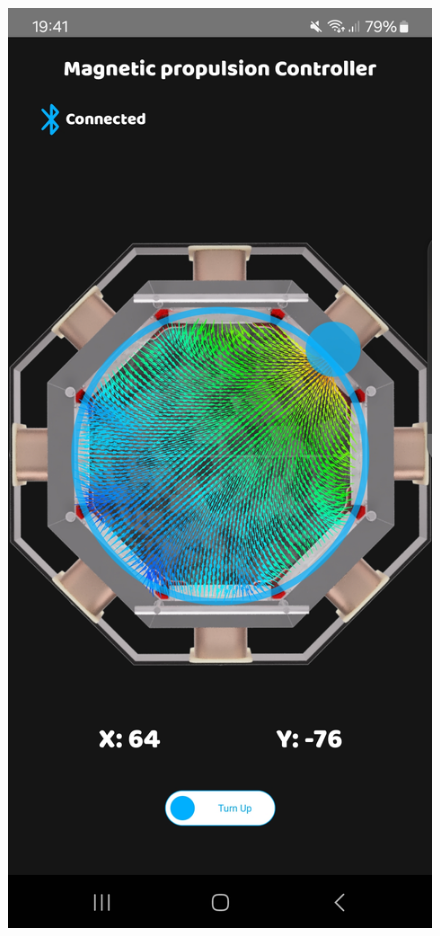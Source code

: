\documentclass{article}
\begin{document}
\begin{figure}[H]
\begin{minipage}{0.3\textwidth}
    \end{minipage}\hfill
   \begin{minipage}{0.3\textwidth}
        \centering
        \includegraphics[width=\linewidth]{Images/app1 (1).jpg}


\end{minipage}
\end{figure}
\end{document}
